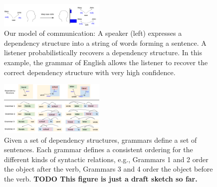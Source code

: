 \documentclass[9pt,twocolumn,twoside,lineno]{pnas-new}
\begin{document}
\begin{figure}
    \centering
    \includegraphics[width=0.45\textwidth]{figures/communication.png}
	\caption{Our model of communication: A speaker (left) expresses a dependency structure into a string of words forming a sentence. A listener probabilistically recovers a dependency structure. In this example, the grammar of English allows the listener to recover the correct dependency structure with very high confidence.}
	\label{fig:comm}
\end{figure}




\begin{figure}
    \centering
    \includegraphics[width=0.45\textwidth]{figures/grammars-colors-trees.png}
	\caption{Given a set of dependency structures, grammars define a set of sentences. Each grammar defines a consistent ordering for the different kinds of syntactic relations, e.g., Grammars 1 and 2 order the object after the verb, Grammars 3 and 4 order the object before the verb. \textbf{TODO This figure is just a draft sketch so far.}}
	\label{fig:grammars}
\end{figure}









%
%
\end{document}
